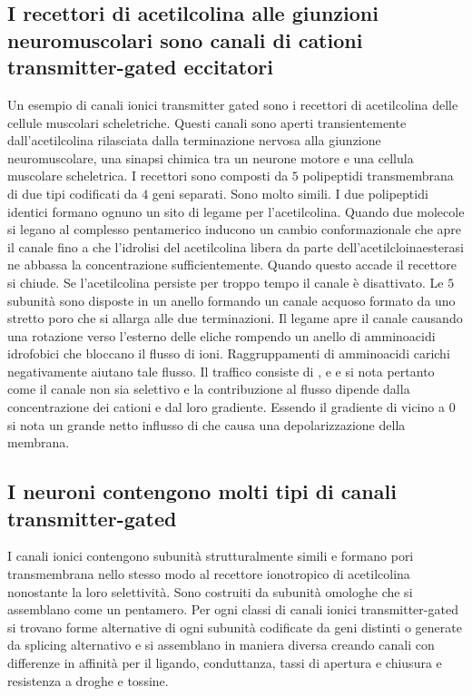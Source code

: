 \subsection{I recettori di acetilcolina alle giunzioni neuromuscolari sono canali di cationi transmitter-gated eccitatori}
Un esempio di canali ionici transmitter gated sono i recettori di acetilcolina delle cellule muscolari scheletriche. Questi canali sono aperti transientemente dall'acetilcolina 
rilasciata dalla terminazione nervosa alla giunzione neuromuscolare, una sinapsi chimica tra un neurone motore e una cellula muscolare scheletrica. I recettori sono composti da $5$ 
polipeptidi transmembrana di due tipi codificati da $4$ geni separati. Sono molto simili. I due polipeptidi identici formano ognuno un sito di legame per l'acetilcolina. Quando
due molecole si legano al complesso pentamerico inducono un cambio conformazionale che apre il canale fino a che l'idrolisi del acetilcolina libera da parte dell'acetilcloinaesterasi ne
abbassa la concentrazione sufficientemente. Quando questo accade il recettore si chiude. Se l'acetilcolina persiste per troppo tempo il canale \`e disattivato. Le $5$ subunit\`a sono
disposte in un anello formando un canale acquoso formato da uno stretto poro che si allarga alle due terminazioni. Il legame apre il canale causando una rotazione verso l'esterno delle
eliche rompendo un anello di amminoacidi idrofobici che bloccano il flusso di ioni. Raggruppamenti di amminoacidi carichi negativamente aiutano tale flusso. Il traffico consiste di 
,  e  e si nota pertanto come il canale non sia selettivo e la contribuzione al flusso dipende dalla concentrazione dei cationi e dal loro gradiente. Essendo
il gradiente di  vicino a $0$ si nota un grande netto influsso di  che causa una depolarizzazione della membrana. 
\subsection{I neuroni contengono molti tipi di canali transmitter-gated}
I canali ionici contengono subunit\`a strutturalmente simili e formano pori transmembrana nello stesso modo al recettore ionotropico di acetilcolina nonostante la loro selettivit\`a. 
Sono costruiti da subunit\`a omologhe che si assemblano come un pentamero. Per ogni classi di canali ionici transmitter-gated si trovano forme alternative di ogni subunit\`a codificate
da geni distinti o generate da splicing alternativo e si assemblano in maniera diversa creando canali con differenze in affinit\`a per il ligando, conduttanza, tassi di apertura e 
chiusura e resistenza a droghe e tossine. 
